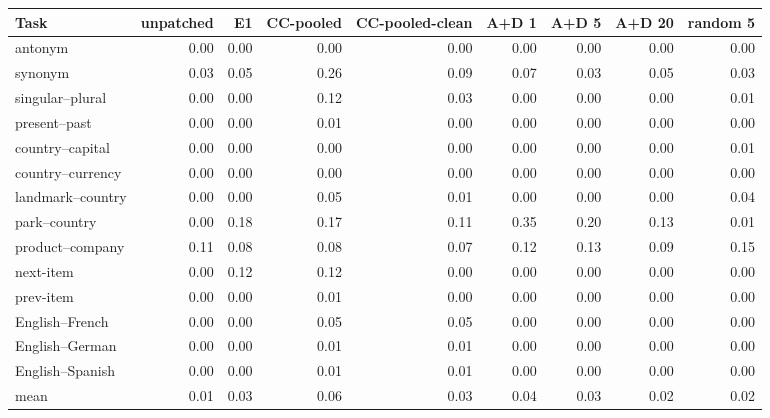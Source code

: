 \begin{tabular}{lrrrrrrrr}
\toprule
Task & unpatched & E1 & CC-pooled & CC-pooled-clean & A+D 1 & A+D 5 & A+D 20 & random 5 \\
\midrule
antonym & 0.00 & 0.00 & 0.00 & 0.00 & 0.00 & 0.00 & 0.00 & 0.00 \\
synonym & 0.03 & 0.05 & 0.26 & 0.09 & 0.07 & 0.03 & 0.05 & 0.03 \\
singular--plural & 0.00 & 0.00 & 0.12 & 0.03 & 0.00 & 0.00 & 0.00 & 0.01 \\
present--past & 0.00 & 0.00 & 0.01 & 0.00 & 0.00 & 0.00 & 0.00 & 0.00 \\
country--capital & 0.00 & 0.00 & 0.00 & 0.00 & 0.00 & 0.00 & 0.00 & 0.01 \\
country--currency & 0.00 & 0.00 & 0.00 & 0.00 & 0.00 & 0.00 & 0.00 & 0.00 \\
landmark--country & 0.00 & 0.00 & 0.05 & 0.01 & 0.00 & 0.00 & 0.00 & 0.04 \\
park--country & 0.00 & 0.18 & 0.17 & 0.11 & 0.35 & 0.20 & 0.13 & 0.01 \\
product--company & 0.11 & 0.08 & 0.08 & 0.07 & 0.12 & 0.13 & 0.09 & 0.15 \\
next-item & 0.00 & 0.12 & 0.12 & 0.00 & 0.00 & 0.00 & 0.00 & 0.00 \\
prev-item & 0.00 & 0.00 & 0.01 & 0.00 & 0.00 & 0.00 & 0.00 & 0.00 \\
English--French & 0.00 & 0.00 & 0.05 & 0.05 & 0.00 & 0.00 & 0.00 & 0.00 \\
English--German & 0.00 & 0.00 & 0.01 & 0.01 & 0.00 & 0.00 & 0.00 & 0.00 \\
English--Spanish & 0.00 & 0.00 & 0.01 & 0.01 & 0.00 & 0.00 & 0.00 & 0.00 \\
\midrule
mean & 0.01 & 0.03 & 0.06 & 0.03 & 0.04 & 0.03 & 0.02 & 0.02 \\
\bottomrule
\end{tabular}
